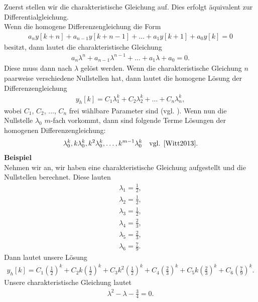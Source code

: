 \documentclass[11pt,a4paper,DIV=12]{scrartcl}
\begin{document}
%
Zuerst stellen wir die charakteristische Gleichung auf. 
%
Dies erfolgt äquivalent zur Differentialgleichung.\\
%
Wenn die homogene Differenzengleichung die Form
%
\begin{gather}
	a_ny[k+n]+a_{n-1}y[k+n-1]+\dots+a_1y[k+1]+a_0y[k]=0
\end{gather}
%
besitzt, dann lautet die charakteristische Gleichung
%
\begin{gather}
	a_n\lambda^n+a_{n-1}\lambda^{n-1}+\dots+a_1\lambda+a_0=0.
\end{gather}
%
Diese muss dann nach $\lambda$ gelöst werden. 
%
Wenn die charakteristische Gleichung $n$ paarweise verschiedene Nullstellen hat, 
dann lautet die homogene Lösung der Differenzengleichung
%
\begin{gather}
	y_h[k]=C_1\lambda_1^k+C_2\lambda_2^k+\dots+C_n\lambda_n^k,
\end{gather}
%
wobei $C_1$, $C_2$, $\dots$, $C_n$ frei wählbare Parameter sind 
(vgl. \cite[Kap. 5, S. 85]{Witt2013}).
%
Wenn nun die Nullstelle $\lambda_0$ $m$-fach vorkommt, 
dann sind folgende Terme Lösungen der homogenen Differenzengleichung:
%
\begin{gather}
	\lambda_0^k,k\lambda_0^k,k^2\lambda_0^k,\dots,k^{m-1}\lambda_0^k\quad\text{vgl. \cite[Kap. 5, S. 91]{Witt2013}}.
\end{gather}
%
\textbf{Beispiel}\\
%
Nehmen wir an, wir haben eine charakteristische Gleichung aufgestellt und 
die Nullstellen berechnet. 
%
Diese lauten
%
\begin{gather}
	\lambda_1 = \frac{1}{2},\nonumber\\
	\lambda_2 = \frac{1}{2},\nonumber\\
	\lambda_3 = \frac{1}{2},\nonumber\\
	\lambda_4 = \frac{2}{3},\nonumber\\
	\lambda_5 = \frac{2}{3},\nonumber\\
	\lambda_6 = \frac{7}{9}.\nonumber
\end{gather}
%
Dann lautet unsere Lösung
%
\begin{gather}
	y_h[k]=C_1\left(\frac{1}{2}\right)^k+C_2k\left(\frac{1}{2}\right)^k+C_3k^2\left(\frac{1}{2}\right)^k+C_4\left(\frac{2}{3}\right)^k+C_5k\left(\frac{2}{3}\right)^k+C_6\left(\frac{7}{9}\right)^k.
\end{gather}
%
Unsere charakteristische Gleichung lautet
%
\begin{gather}
	\lambda^2-\lambda-\frac{3}{4}=0.
\end{gather}
\end{document}
